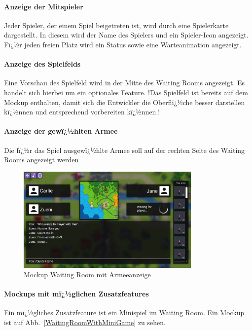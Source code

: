 \documentclass[12pt, titlepage]{scrartcl}
\newcommand{\Abb}[1]{%
	Abb.\ \ref{#1}%
}
\begin{document}
		\paragraph{Anzeige der Mitspieler}
		Jeder Spieler, der einem Spiel beigetreten ist, wird durch eine \glqq Spielerkarte \grqq dargestellt. In diesem wird der Name des Spielers und ein Spieler-Icon angezeigt. Fï¿½r jeden freien Platz wird ein Status sowie eine Warteanimation angezeigt.  
		\paragraph{Anzeige des Spielfelds}
		Eine Vorschau des Spielfeld wird in der Mitte des Waiting Rooms angezeigt. Es handelt sich hierbei um ein optionales Feature. !Das Spielfeld ist bereits auf dem Mockup enthalten, damit sich die Entwickler die Oberflï¿½che besser darstellen kï¿½nnen und entsprechend vorbereiten kï¿½nnen.!
		\paragraph{Anzeige der gewï¿½hlten Armee}
		Die fï¿½r das Spiel ausgewï¿½hlte Armee soll auf der rechten Seite des Waiting Rooms angezeigt werden
		
		\begin{figure}[H] 
			\centering
			\includegraphics[width=0.8\textwidth]{Waiting_Room_Game_mit_ArmyView.png}
			\caption{Mockup Waiting Room mit Armeeanzeige}
			\label{WaitingRoomWithArmy}
		\end{figure}
	
		\paragraph{Mockups mit mï¿½glichen Zusatzfeatures}
		Ein mï¿½gliches Zusatzfeature ist ein Minispiel im Waiting Room. Ein Mockup ist auf \Abb{WaitingRoomWithMiniGame} zu sehen.
		
\end{document}
